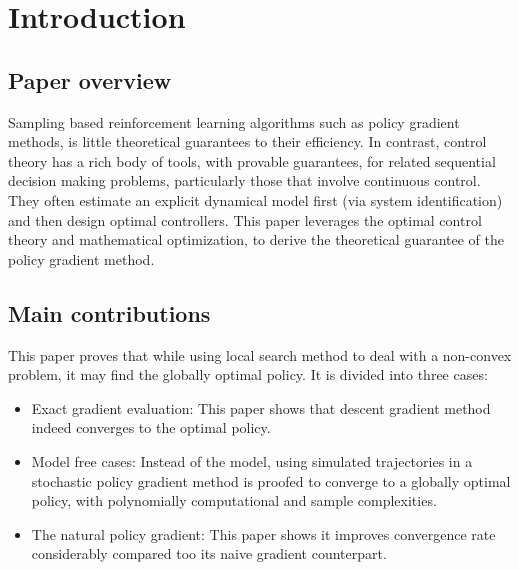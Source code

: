 \section{Introduction}

\subsection{Paper overview}
Sampling based reinforcement learning algorithms such as policy gradient methods, is little theoretical guarantees to their efficiency. In contrast, control theory has a rich body of tools, with provable guarantees, for related sequential decision making problems, particularly those that involve continuous control. They often estimate an explicit dynamical model first (via system identification) and then design optimal controllers.\newline
This paper leverages the optimal control theory and mathematical optimization, to derive the theoretical guarantee of the policy gradient method.


\subsection{Main contributions}
This paper proves that while using local search method to deal with a non-convex problem, it may find the globally optimal policy. It is divided into three cases:\newline

\begin{itemize}
    \item Exact gradient evaluation: This paper shows that descent gradient method indeed converges to the optimal policy.
    \item Model free cases: Instead of the model, using simulated trajectories in a stochastic policy gradient method is proofed to converge to a globally optimal policy, with polynomially computational and sample complexities.
    \item The natural policy gradient: This paper shows it improves convergence rate considerably compared too its naive gradient counterpart.
\end{itemize}


